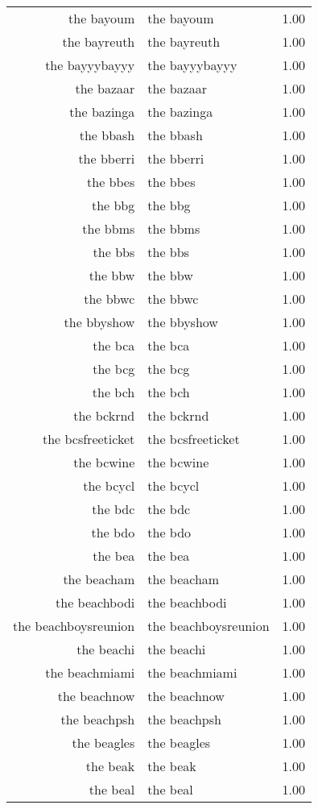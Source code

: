 \begin{table}[ht]
\begin{tabular}{rlr}
  the bayoum & the bayoum & 1.00 \\ 
  the bayreuth & the bayreuth & 1.00 \\ 
  the bayyybayyy & the bayyybayyy & 1.00 \\ 
  the bazaar & the bazaar & 1.00 \\ 
  the bazinga & the bazinga & 1.00 \\ 
  the bbash & the bbash & 1.00 \\ 
  the bberri & the bberri & 1.00 \\ 
  the bbes & the bbes & 1.00 \\ 
  the bbg & the bbg & 1.00 \\ 
  the bbms & the bbms & 1.00 \\ 
  the bbs & the bbs & 1.00 \\ 
  the bbw & the bbw & 1.00 \\ 
  the bbwc & the bbwc & 1.00 \\ 
  the bbyshow & the bbyshow & 1.00 \\ 
  the bca & the bca & 1.00 \\ 
  the bcg & the bcg & 1.00 \\ 
  the bch & the bch & 1.00 \\ 
  the bckrnd & the bckrnd & 1.00 \\ 
  the bcsfreeticket & the bcsfreeticket & 1.00 \\ 
  the bcwine & the bcwine & 1.00 \\ 
  the bcycl & the bcycl & 1.00 \\ 
  the bdc & the bdc & 1.00 \\ 
  the bdo & the bdo & 1.00 \\ 
  the bea & the bea & 1.00 \\ 
  the beacham & the beacham & 1.00 \\ 
  the beachbodi & the beachbodi & 1.00 \\ 
  the beachboysreunion & the beachboysreunion & 1.00 \\ 
  the beachi & the beachi & 1.00 \\ 
  the beachmiami & the beachmiami & 1.00 \\ 
  the beachnow & the beachnow & 1.00 \\ 
  the beachpsh & the beachpsh & 1.00 \\ 
  the beagles & the beagles & 1.00 \\ 
  the beak & the beak & 1.00 \\ 
  the beal & the beal & 1.00 \\ 

\end{tabular}
\end{table}
